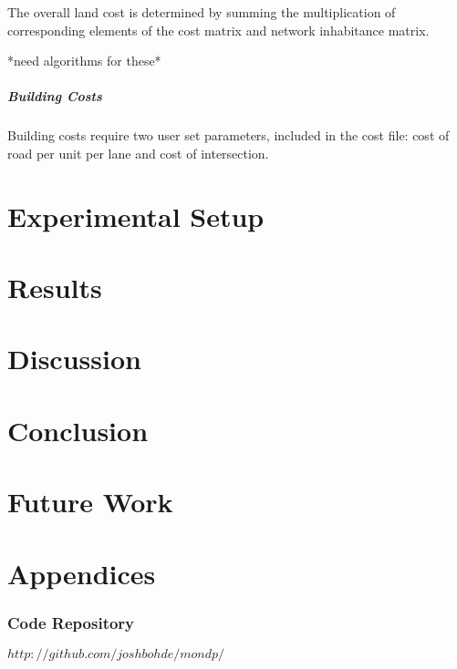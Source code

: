 \documentclass[11pt, oneside, notitlepage, draft]{article}
\begin{document}
                The overall land cost is determined by summing the multiplication of corresponding elements of the cost matrix and network inhabitance matrix.

                *need algorithms for these*

            \subsubsection{Building Costs}
                Building costs require two user set parameters, included in the cost file: cost of road per unit per lane and cost of intersection. 


\part{Experimental Setup}

\part{Results}

\part{Discussion}

\part{Conclusion}

\part{Future Work}

\clearpage
\appendix
\part*{Appendices}
\section{Code Repository}
$http://github.com/joshbohde/mondp/$
\end{document}
